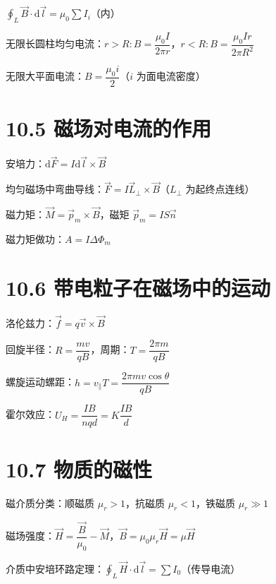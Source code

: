 \documentclass{ctexart}
\begin{document}
$\displaystyle\oint_L \vec{B}\cdot\mathrm{d}\vec{l} = \mu_0\sum I_i$（内）

无限长圆柱均匀电流：$r > R: B = \dfrac{\mu_0 I}{2\pi r}$，$r < R: B = \dfrac{\mu_0 Ir}{2\pi R^{2}}$

无限大平面电流：$B = \dfrac{\mu_0 i}{2}$（$i$ 为面电流密度）

\section*{10.5 磁场对电流的作用}

安培力：$\mathrm{d}\vec{F} = I\mathrm{d}\vec{l}\times\vec{B}$

均匀磁场中弯曲导线：$\vec{F} = I\vec{L}_{\perp}\times\vec{B}$（$L_{\perp}$ 为起终点连线）

磁力矩：$\vec{M} = \vec{p}_m\times\vec{B}$，磁矩 $\vec{p}_m = IS\vec{n}$

磁力矩做功：$A = I\Delta\Phi_m$

\section*{10.6 带电粒子在磁场中的运动}

洛伦兹力：$\vec{f} = q\vec{v}\times\vec{B}$

回旋半径：$R = \dfrac{mv}{qB}$，周期：$T = \dfrac{2\pi m}{qB}$

螺旋运动螺距：$h = v_{\parallel}T = \dfrac{2\pi mv\cos\theta}{qB}$

霍尔效应：$U_H = \dfrac{IB}{nqd} = K\dfrac{IB}{d}$

\section*{10.7 物质的磁性}

磁介质分类：顺磁质 $\mu_r > 1$，抗磁质 $\mu_r < 1$，铁磁质 $\mu_r \gg 1$

磁场强度：$\vec{H} = \dfrac{\vec{B}}{\mu_0} - \vec{M}$，$\vec{B} = \mu_0\mu_r\vec{H} = \mu\vec{H}$

介质中安培环路定理：$\displaystyle\oint_L \vec{H}\cdot\mathrm{d}\vec{l} = \sum I_0$（传导电流）
\end{document}
